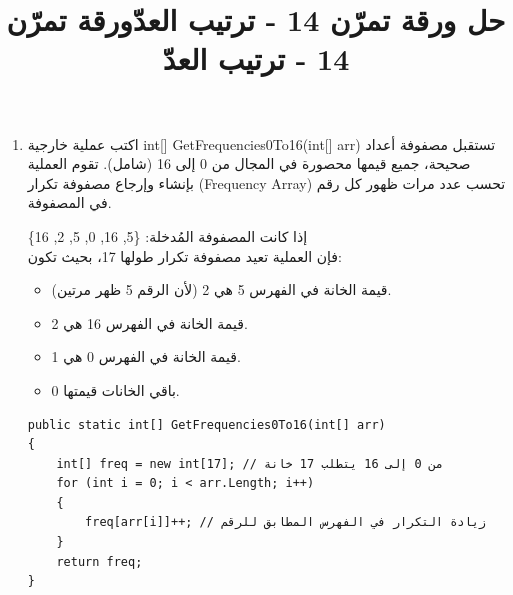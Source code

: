 \documentclass[14pt]{extarticle}
\title{حل ورقة تمرّن 14 - ترتيب العدّ}
\title{ورقة تمرّن 14 - ترتيب العدّ}
\begin{document}
\maketitle
\thispagestyle{fancy}

\begin{enumerate}[itemsep=2em]


    \item
    اكتب عملية خارجية \textenglish{int[] GetFrequencies0To16(int[] arr)} تستقبل مصفوفة أعداد صحيحة، جميع قيمها محصورة في المجال من 0 إلى 16 (شامل). تقوم العملية بإنشاء وإرجاع مصفوفة تكرار (\textenglish{Frequency Array}) تحسب عدد مرات ظهور كل رقم في المصفوفة.

    \begin{boxExample}
    إذا كانت المصفوفة المُدخلة: \textenglish{\{5, 16, 0, 5, 2, 16\}} \\
    فإن العملية تعيد مصفوفة تكرار طولها 17، بحيث تكون:
    \begin{itemize}
        \item قيمة الخانة في الفهرس 5 هي 2 (لأن الرقم 5 ظهر مرتين).
        \item قيمة الخانة في الفهرس 16 هي 2.
        \item قيمة الخانة في الفهرس 0 هي 1.
        \item باقي الخانات قيمتها 0.
    \end{itemize}
    \end{boxExample}

    \ifwithsols
    \begin{boxSolution}
    \begin{english}
    \begin{verbatim}
public static int[] GetFrequencies0To16(int[] arr)
{
    int[] freq = new int[17]; // من 0 إلى 16 يتطلب 17 خانة
    for (int i = 0; i < arr.Length; i++)
    {
        freq[arr[i]]++; // زيادة التكرار في الفهرس المطابق للرقم
    }
    return freq;
}
    \end{verbatim}
    \end{english}
    \end{boxSolution}
    \clearpage
    \fi



\end{enumerate}
\end{document}
